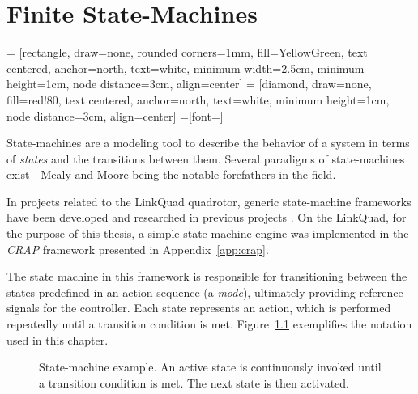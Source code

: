 \chapter{Finite State-Machines}
\label{cha:logic}
     = [rectangle, draw=none, rounded corners=1mm, fill=YellowGreen,
                    text centered, anchor=north, text=white, minimum width=2.5cm, minimum height=1cm, node distance=3cm, align=center]
     = [diamond, draw=none, fill=red!80,
                    text centered, anchor=north, text=white, minimum height=1cm, node distance=3cm, align=center]
    =[font=\scriptsize]

    State-machines are a modeling tool to describe the behavior of a system
    in terms of \textit{states} and the transitions between them.
    Several paradigms of state-machines exist - Mealy and Moore being the notable forefathers in the field.

    In projects related to the LinkQuad quadrotor, generic state-machine
    frameworks have been developed and researched in previous projects \citep{Merz06,Wzorek11}.
    On the LinkQuad, for the purpose of this thesis, a simple state-machine engine
    was implemented in the \textit{CRAP} framework presented in Appendix~\ref{app:crap}.

    The state machine in this framework is responsible for transitioning between the
    states predefined in an action sequence (a \textit{mode}), ultimately
    providing reference signals for the controller.
    Each state represents an action, which is performed repeatedly until
    a transition condition is met.
    Figure~\ref{fig:logic:statemachine} exemplifies the notation used in this chapter.

    \begin{figure}[H]
        \noindent{}
        \caption{State-machine example. An active state is continuously invoked until a transition condition is met. The next state is then activated.}
        \label{fig:logic:statemachine}
    \end{figure}

